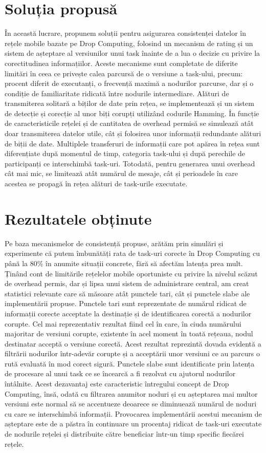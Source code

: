 \documentclass[12pt,a4paper]{report}
\begin{document}
\section{Soluția propusă} 
În această lucrare, propunem soluții pentru asigurarea consistenței datelor în rețele mobile bazate pe Drop Computing, folosind un mecanism de rating și un sistem de așteptare al versiunilor unui task înainte de a lua o decizie cu privire la corectitudinea informațiilor. Aceste mecanisme sunt completate de diferite limitări în ceea ce privește calea parcursă de o versiune a task-ului, precum: procent diferit de executanți, o frecvență maximă a nodurilor parcurse, dar și o condiție de familiaritate ridicată între nodurile intermediare. Alături de transmiterea solitară a biților de date prin rețea, se implementează și un sistem de detecție și corecție al unor biți corupți utilizând codurile Hamming. În funcție de caracteristicile rețelei și de cantitatea de overhead permisă se simulează atât doar transmiterea datelor utile, cât și folosirea unor informații redundante alături de biții de date. Multiplele transferuri de informații care pot apărea în rețea sunt diferențiate după momentul de timp, categoria task-ului și după perechile de participanți ce interschimbă task-uri. Totodată, pentru generarea unui overhead cât mai mic, se limitează atât numărul de mesaje, cât și perioadele în care acestea se propagă în rețea alături de task-urile executate.
\section{Rezultatele obținute}
Pe baza mecanismelor de consistență propuse, arătăm prin simulări și experimente că putem îmbunătăți rata de task-uri corecte în Drop Computing cu până la 80\% în anumite situații concrete, fără să afectăm latența prea mult. Ținând cont de limitările rețelelor mobile oportuniste cu privire la nivelul scăzut de overhead permis, dar și lipsa unui sistem de administrare central, am creat statistici relevante care să măsoare atât punctele tari, cât și punctele slabe ale implementării propuse. Punctele tari sunt reprezentate de numărul ridicat de informații corecte acceptate la destinație și de identificarea corectă a nodurilor corupte. Cel mai reprezentativ rezultat fiind cel în care, în ciuda numărului majoritar de versiuni corupte, existente în acel moment în toată rețeaua, nodul destinatar acceptă o versiune corectă. Acest rezultat reprezintă dovada evidentă a filtrării nodurilor într-adevăr corupte și a acceptării unor versiuni ce au parcurs o rută evaluată în mod corect sigură. Punctele slabe sunt identificate prin latența de procesare al unui task ce se încearcă a fi rezolvat cu ajutorul nodurilor întâlnite. Acest dezavantaj este caracteristic întregului concept de Drop Computing, însă, odată cu filtrarea anumitor noduri și cu așteptarea mai multor versiuni este normal să se accentueze deoarece se diminuează numărul de noduri cu care se interschimbă informații. Provocarea implementării acestui mecanism de așteptare este de a păstra în continuare un procentaj ridicat de task-uri executate de nodurile rețelei și distribuite către beneficiar într-un timp specific fiecărei rețele. 
\end{document}
